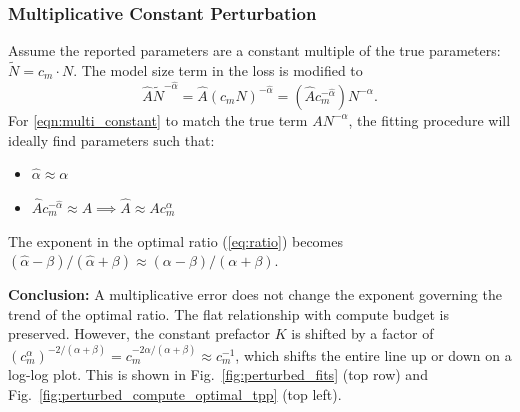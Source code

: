 \subsubsection{Multiplicative Constant Perturbation}
\label{app:theoretical_analysis:subsec:multiplicative}

Assume the reported parameters are a constant multiple of the true parameters: $\tilde{N} = c_m \cdot N$. The model size term in the loss is modified to
\begin{equation}
\label{eqn:multi_constant}
    \hat{A} \tilde{N}^{-\hat{\alpha}} = \hat{A} (c_m N)^{-\hat{\alpha}} = (\hat{A} c_m^{-\hat{\alpha}}) N^{-\hat{\alpha}}.
\end{equation}
For \cref{eqn:multi_constant} to match the true term $A N^{-\alpha}$, the fitting procedure will ideally find parameters such that:
\begin{itemize}
    \item $\hat{\alpha} \approx \alpha$
    \item $\hat{A} c_m^{-\hat{\alpha}} \approx A \implies \hat{A} \approx A c_m^{\alpha}$
\end{itemize}
The exponent in the optimal ratio (\ref{eq:ratio}) becomes $(\hat{\alpha} - \beta)/(\hat{\alpha} + \beta) \approx (\alpha - \beta)/(\alpha + \beta)$.

\textbf{Conclusion:} A multiplicative error does not change the exponent governing the trend of the optimal ratio. The flat relationship with compute budget is preserved. However, the constant prefactor $K$ is shifted by a factor of $(c_m^\alpha)^{-2/(\alpha+\beta)} = c_m^{-2\alpha/(\alpha+\beta)}\approx c_m^{-1}$, which shifts the entire line up or down on a log-log plot. This is shown in Fig.~\ref{fig:perturbed_fits} (top row) and Fig.~\ref{fig:perturbed_compute_optimal_tpp} (top left).






